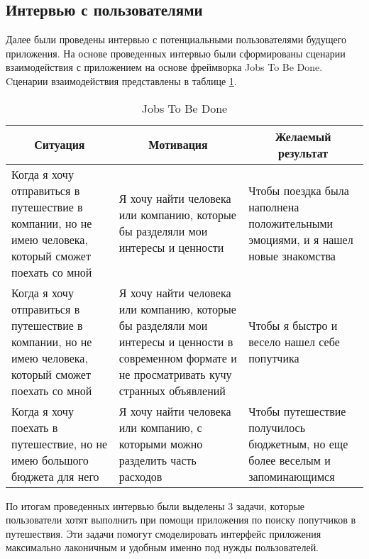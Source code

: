 


\subsection{Интервью с пользователями}

Далее были проведены интервью с потенциальными пользователями будущего приложения. На основе проведенных интервью были сформированы сценарии взаимодействия с приложением на основе фреймворка Jobs To Be Done. Cценарии взаимодействия представлены в таблице \ref{jtbd}.

\begin{table}[H]
    \raggedright
    \caption{Jobs To Be Done}\label{jtbd}
    \begin{tabularx}{\textwidth}{|X|X|X|}
        \hline
        \multicolumn{1}{|c|}{Ситуация} & \multicolumn{1}{c|}{Мотивация} & \multicolumn{1}{c|}{Желаемый результат} \\ \hline
        Когда я хочу отправиться в путешествие в компании, но не имею человека, который сможет поехать со мной &
        Я хочу найти человека или компанию, которые бы разделяли мои интересы и ценности &
        Чтобы поездка была наполнена положительными эмоциями, и я нашел новые знакомства \\ \hline
        Когда я хочу отправиться в путешествие в компании, но не имею человека, который сможет поехать со мной &
        Я хочу найти человека или компанию, которые бы разделяли мои интересы и ценности в современном формате и не просматривать кучу странных объявлений &
        Чтобы я быстро и весело нашел себе попутчика \\ \hline
        Когда я хочу поехать в путешествие, но не имею большого бюджета для него &
        Я хочу найти человека или компанию, с которыми можно разделить часть расходов &
        Чтобы путешествие получилось бюджетным, но еще более веселым и запоминающимся \\ \hline
    \end{tabularx}
\end{table}

По итогам проведенных интервью были выделены 3 задачи, которые пользователи хотят выполнить при помощи приложения по поиску попутчиков в путешествия. Эти задачи помогут смоделировать интерфейс приложения максимально лаконичным и удобным именно под нужды пользователей.

